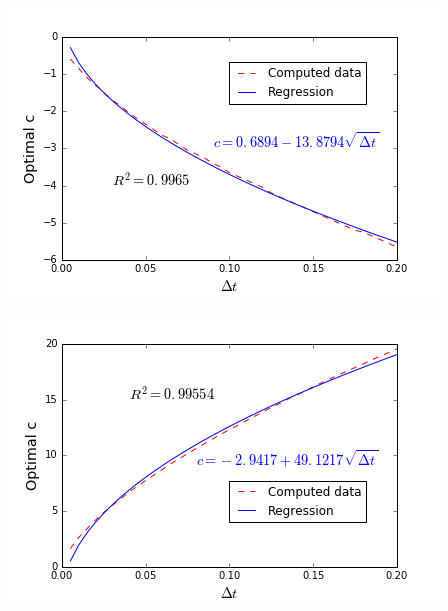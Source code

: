 \begingroup
\begin{minipage}{.5\linewidth}
\begin{center}
	\includegraphics[scale=.5]{figures/FinalFigures/regressionDtFinalVersionNMarshal.png}
\end{center}
\end{minipage}
\begin{minipage}{.5\linewidth}
\begin{center}
	\includegraphics[scale=.5]{figures/FinalFigures/regressionDtFinalVersionPMarshal.png}
\end{center}
\end{minipage}

